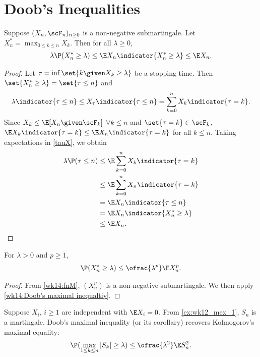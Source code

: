 \documentclass[../aipt.tex]{subfiles}
\begin{document}
\section{Doob's Inequalities}

\begin{Theorem}\label{wk14:Doob's maximal inequaltiy}
Suppose $(X_n,\scF_n)_{n\geq0}$ is a non-negative submartingale. Let $X_n^* = \max_{0\leq k \leq n} X_k$. Then for all $\lambda \geq 0$, 
\begin{align}
\lambda \P(X_n^* \geq \lambda) \leq \E X_n\indicator{X_n^*\geq\lambda} \leq \E X_n.
\end{align}
\end{Theorem}
\begin{proof}
Let $\tau = \inf\set{k \given X_k\geq\lambda}$ be a stopping time. Then $\set{X_n^* \geq\lambda} = \set{\tau\leq n}$ and
\begin{align}\label{tauX}
\lambda \indicator{\tau\leq n} \leq X_\tau \indicator{\tau \leq n} = \sum_{k=0}^n X_k\indicator{\tau=k}.
\end{align}
Since $X_k \leq \E[X_n \given \scF_k]$ $\forall k \leq n$ and $\set{\tau=k}\in\scF_k$, $\E X_k\indicator{\tau=k} \leq \E X_n\indicator{\tau=k}$ for all $k \leq n$. Taking expectations in \cref{tauX}, we obtain
\begin{align*}
\lambda \P(\tau\leq n) 
&\leq \E\sum_{k=0}^n X_k\indicator{\tau=k} \\
&\leq \E\sum_{k=0}^n X_n\indicator{\tau=k} \\
&= \E X_n\indicator{\tau\leq n} \\
&= \E X_n \indicator{X_n^*\geq\lambda}\\
&\leq \E X_n.
\end{align*}
\end{proof}

\begin{Corollary}
For $\lambda>0$ and $p\geq 1$,
\begin{align*}
\P(X_n^* \geq\lambda) \leq \ofrac{\lambda^p} \E X_n^p.
\end{align*}
\end{Corollary}
\begin{proof}
From \cref{wk14:fnM}, $(X_n^p)$ is a non-negative submartingale. We then apply \cref{wk14:Doob's maximal inequaltiy}.
\end{proof}

\begin{Example}
Suppose $X_i$, $i\geq1$ are independent with $\E X_i=0$. From \cref{ex:wk12_mex_1}, $S_n$ is a martingale. Doob's maximal inequality (or its corollary) recovers Kolmogorov's maximal equality:
\begin{align*}
\P(\max_{1\leq k\leq n} |S_k| \geq \lambda) \leq \ofrac{\lambda^2} \E S_n^2.
\end{align*}
\end{Example}
\end{document}
